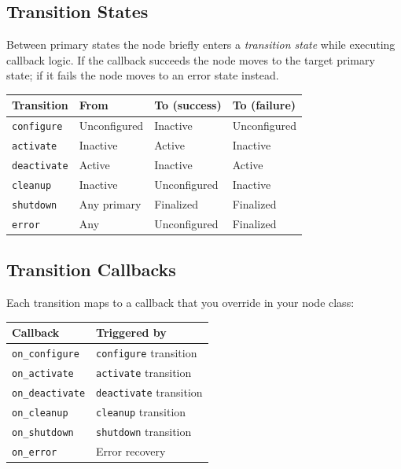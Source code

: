 \documentclass[12pt,a4paper]{article}
\newcommand{\code}[1]{\texttt{#1}}
\begin{document}
\subsection{Transition States}

Between primary states the node briefly enters a \emph{transition state}
while executing callback logic.  If the callback succeeds the node moves to
the target primary state; if it fails the node moves to an error state
instead.

\begin{center}
\begin{tabular}{llll}
  \toprule
  \textbf{Transition} & \textbf{From} & \textbf{To (success)} & \textbf{To (failure)} \\
  \midrule
  \texttt{configure}   & Unconfigured & Inactive     & Unconfigured \\
  \texttt{activate}    & Inactive     & Active       & Inactive \\
  \texttt{deactivate}  & Active       & Inactive     & Active \\
  \texttt{cleanup}     & Inactive     & Unconfigured & Inactive \\
  \texttt{shutdown}    & Any primary  & Finalized    & Finalized \\
  \texttt{error}       & Any          & Unconfigured & Finalized \\
  \bottomrule
\end{tabular}
\end{center}

\subsection{Transition Callbacks}

Each transition maps to a callback that you override in your node class:

\begin{center}
\begin{tabular}{ll}
  \toprule
  \textbf{Callback} & \textbf{Triggered by} \\
  \midrule
  \code{on\_configure}   & \texttt{configure} transition \\
  \code{on\_activate}    & \texttt{activate} transition \\
  \code{on\_deactivate}  & \texttt{deactivate} transition \\
  \code{on\_cleanup}     & \texttt{cleanup} transition \\
  \code{on\_shutdown}    & \texttt{shutdown} transition \\
  \code{on\_error}       & Error recovery \\
  \bottomrule
\end{tabular}
\end{center}
\end{document}
